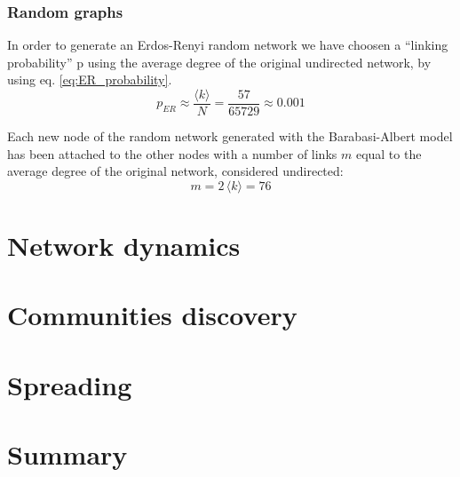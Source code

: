 \documentclass[12pt, twoside]{report}
\begin{document}
    \subsection{Random graphs} 
    In order to generate an Erdos-Renyi random network we have choosen a ``linking probability'' p using the average degree of the original undirected network, by using eq. \ref{eq:ER_probability}.
    \begin{equation}
      p_{ER} \approx \frac{\langle k  \rangle}{N} = \frac{57}{65729} \approx  0.001
      \label{eq:ER_probability}
    \end{equation}

    Each new node of the random network generated with the Barabasi-Albert model has been attached to the other nodes with a number of links $m$ equal to the average degree of the original network, considered undirected:
    \begin{equation}
      m = 2 \, \langle k \rangle = 76
      \label{eq:BA_model}
    \end{equation}

    


    
    
    \chapter{Network dynamics}

    \chapter{Communities discovery}

    \chapter{Spreading}
    

    \chapter{Summary}


\printbibliography[title={References}]
\end{document}
